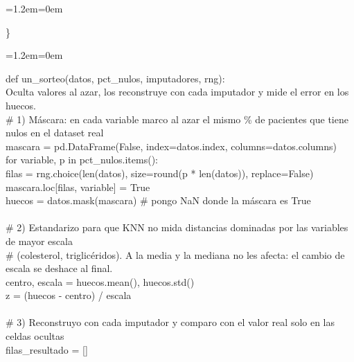 \documentclass[11pt,a4paper]{article}
\newenvironment{codigo}
  {\par\smallskip\begin{list}{}{\leftmargin=1.2em\rightmargin=0em}\item\relax\ttfamily\scriptsize\raggedright}
  {\end{list}\smallskip}
\begin{document}
{\begin{codigo}
\}
\end{codigo}
\begin{codigo}
def un\_\allowbreak{}sorteo(datos, pct\_\allowbreak{}nulos, imputadores, rng): \\{}
\hspace*{2.08em}\textquotedbl{}\textquotedbl{}\textquotedbl{}Oculta valores al azar, los reconstruye con cada imputador y mide el error en los huecos.\textquotedbl{}\textquotedbl{}\textquotedbl{} \\{}
\hspace*{2.08em}\# 1) Máscara: en cada variable marco al azar el mismo \% de pacientes que tiene nulos en el dataset real \\{}
\hspace*{2.08em}mascara = pd.DataFrame(False, index=datos.index, columns=datos.columns) \\{}
\hspace*{2.08em}for variable, p in pct\_\allowbreak{}nulos.items(): \\{}
\hspace*{4.16em}filas = rng.choice(len(datos), size=round(p * len(datos)), replace=False) \\{}
\hspace*{4.16em}mascara.loc[filas, variable] = True \\{}
\hspace*{2.08em}huecos = datos.mask(mascara)                       \# pongo NaN donde la máscara es True \\{}
\mbox{} \\{}
\hspace*{2.08em}\# 2) Estandarizo para que KNN no mida distancias dominadas por las variables de mayor escala \\{}
\hspace*{2.08em}\#    (colesterol, triglicéridos). A la media y la mediana no les afecta: el cambio de escala se deshace al final. \\{}
\hspace*{2.08em}centro, escala = huecos.mean(), huecos.std() \\{}
\hspace*{2.08em}z = (huecos - centro) /\allowbreak{} escala \\{}
\mbox{} \\{}
\hspace*{2.08em}\# 3) Reconstruyo con cada imputador y comparo con el valor real solo en las celdas ocultas \\{}
\hspace*{2.08em}filas\_\allowbreak{}resultado = [] \\{}

\end{codigo}}
\end{document}
